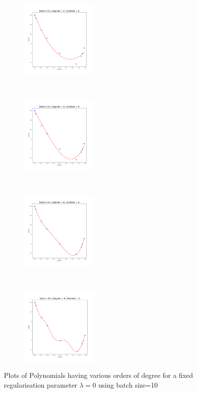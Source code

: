 \newpage
\begin{figure}[!ht]
    \centering
    \begin{subfigure}[t]{0.25\textwidth}
        \centering
        \includegraphics[height=1.5in]{Task 1 Images/Batch 10/Figure_1.png}
    \end{subfigure}%
    ~ 
    \begin{subfigure}[t]{0.25\textwidth}
        \centering
        \includegraphics[height=1.5in]{Task 1 Images/Batch 10/Figure_2.png}
    \end{subfigure}%
    ~
    \begin{subfigure}[t]{0.25\textwidth}
        \centering
        \includegraphics[height=1.5in]{Task 1 Images/Batch 10/Figure_3.png}
    \end{subfigure}%
    ~ 
    \begin{subfigure}[t]{0.25\textwidth}
        \centering
        \includegraphics[height=1.5in]{Task 1 Images/Batch 10/Figure_4.png}
    \end{subfigure}%
    \caption{Plots of Polynomials having various orders of degree for a fixed regularisation parameter $\lambda = 0$ using batch size=10}
    \label{fig:1}
\end{figure}


